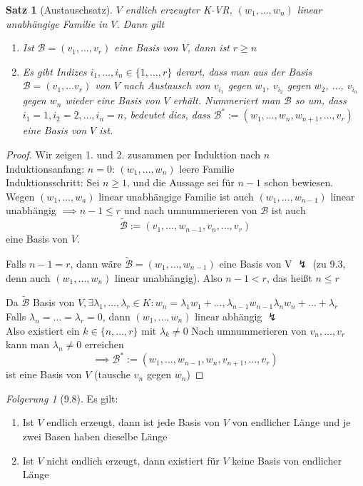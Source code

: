 \documentclass[a4paper]{scrartcl}
\DeclareMathOperator{\Exists}{\exists}
\theoremstyle{definition}
\theoremstyle{plain}
\newtheorem{thm}{Satz}
\theoremstyle{plain}
\theoremstyle{remark}
\theoremstyle{remark}
\theoremstyle{remark}
\newtheorem{conc}{Folgerung}
\theoremstyle{remark}
\theoremstyle{remark}
\begin{document}
\begin{thm}[Austauschsatz]
$V$ endlich erzeugter K-VR, $(w_1, \ldots, w_n)$ linear unabhängige Familie in $V$. Dann gilt
\begin{enumerate}
\item Ist $\mathcal{B} = (v_1, \ldots, v_r)$ eine Basis von $V$, dann ist $r \geq n$
\item Es gibt Indizes $i_1, \ldots, i_n \in \{1, \ldots, r\}$ derart, dass man aus der Basis $\mathcal{B} = (v_1, \ldots v_r)$ von $V$ nach Austausch von $v_{i_1}$ gegen $w_1$, $v_{i_2}$ gegen $w_2$, $\ldots$, $v_{i_n}$ gegen $w_n$ wieder eine Basis von $V$ erhält.
Nummeriert man $\mathcal{B}$ so um, dass $i_1 = 1, i_2 = 2, \ldots, i_n = n$, bedeutet dies, dass $\mathcal{B}^\ast :=(w_1, \ldots, w_n, w_{n + 1}, \ldots, v_r)$ eine Basis von $V$ ist.
\end{enumerate}
\end{thm}
\begin{proof}
Wir zeigen 1. und 2. zusammen per Induktion nach $n$ \\
  Induktionsanfang: $n = 0$: $(w_1, \ldots, w_n)$ leere Familie \\
  Induktionsschritt: Sei $n \geq 1$, und die Aussage sei für $n - 1$ schon bewiesen. Wegen $(w_1, \ldots, w_a)$ linear unabhängige Familie ist auch $(w_1, \ldots, w_{n - 1})$ linear unabhängig $\implies n - 1 \leq r$ und nach umnummerieren von $\mathcal{B}$ ist auch
\[\tilde{\mathcal{B}} := (v_1, \ldots, w_{n - 1}, v_n, \ldots, v_r)\]
eine Basis von $V$.

Falls $n - 1 = r$, dann wäre $\tilde{\mathcal{B}} = (w_1, \ldots, w_{n - 1})$ eine Basis von V $\lightning$ (zu 9.3, denn auch $(w_1, \ldots, w_n)$ linear unabhängig).
Also $n - 1 < r$, das heißt $n \leq r$

Da $\tilde{\mathcal{B}}$ Basis von $V, \Exists \lambda_1, \ldots, \lambda_r \in K: w_n = \lambda_1 w_1 + \ldots, \lambda_{n - 1} w_{n - 1} \lambda_n w_n + \ldots + \lambda_r$ \\
  Falls $\lambda_n = \ldots = \lambda_r = 0$, dann $(w_1, \ldots, w_n)$ linear abhängig $\lightning$ \\
  Also existiert ein $k \in \{n, \ldots, r\}$ mit $\lambda_k \neq 0$ Nach umnummerieren von $v_n, \ldots, v_r$ kann man $\lambda_n \neq 0$ erreichen
\[\implies \mathcal{B}^\ast := (w_1, \ldots, w_{n - 1}, w _n, v_{n + 1}, \ldots, v_r)\] ist eine Basis von $V$ (tausche $v_n$ gegen $w_n$)
\end{proof}
\begin{conc}[9.8]
Es gilt:
\begin{enumerate}
\item Ist $V$ endlich erzeugt, dann ist jede Basis von $V$ von endlicher Länge und je zwei Basen haben dieselbe Länge
\item Ist $V$ nicht endlich erzeugt, dann existiert für $V$ keine Basis von endlicher Länge
\end{enumerate}
\end{conc}
\end{document}
